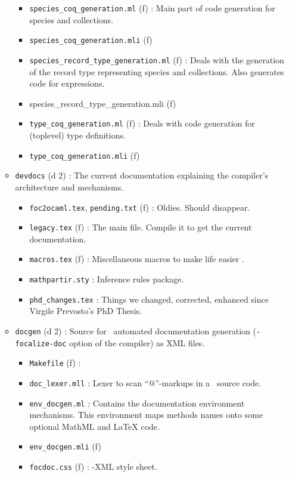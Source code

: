 \begin{itemize}
\begin{itemize}
\begin{itemize}
    \item {\tt species\_coq\_generation.ml} (f) : Main part of code
      generation for species and collections.
    \item {\tt species\_coq\_generation.mli} (f)
    \item {\tt species\_record\_type\_generation.ml} (f) : Deals with the
      generation of the record type representing species and
      collections. Also generates code for expressions.
    \item {species\_record\_type\_generation.mli} (f)
    \item {\tt type\_coq\_generation.ml} (f) : Deals with code generation
      for (toplevel) type definitions.
    \item {\tt type\_coq\_generation.mli} (f)
    \end{itemize}
  \item {\tt devdocs} (d 2) : The current documentation explaining the
    compiler's architecture and mechanisms.
    \begin{itemize}
    \item {\tt foc2ocaml.tex}, {\tt pending.txt} (f) :
      Oldies. Should disappear.
    \item {\tt legacy.tex} (f) : The main \latex file. Compile it to
      get the current documentation.
    \item {\tt macros.tex} (f) : Miscellaneous macros to make life
      easier \smiley.
    \item {\tt mathpartir.sty} : Inference rules package.
    \item {\tt phd\_changes.tex} : Things we changed, corrected,
      enhanced since Virgile Prevosto's PhD Thesis.
    \end{itemize}
  \item {\tt docgen} (d 2) : Source for \focalizec\ automated
    documentation generation ({\tt -focalize-doc} option of the
    compiler) as XML files.
    \begin{itemize}
    \item {\tt Makefile} (f) :
    \item {\tt doc\_lexer.mll} : Lexer to scan ``@''-markups in a
      \focalize\ source code.
    \item {\tt env\_docgen.ml} : Contains the documentation environment
      mechanisms. This environment maps methods names onto some optional MathML
      and LaTeX code.
    \item {\tt env\_docgen.mli} (f)
    \item {\tt focdoc.css} (f) : \focalizedoc-XML style sheet.

\end{itemize}
\end{itemize}
\end{itemize}

